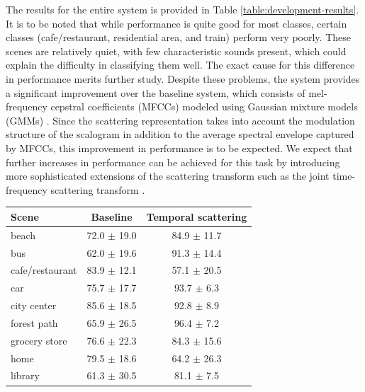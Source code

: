 \documentclass{article}
\begin{document}
\begin{sloppy}
The results for the entire system is provided in Table \ref{table:development-results}. It is to be noted that while performance is quite good for most classes, certain classes (\textsf{cafe/restaurant}, \textsf{residential area}, and \textsf{train}) perform very poorly. These scenes are relatively quiet, with few characteristic sounds present, which could explain the difficulty in classifying them well. The exact cause for this difference in performance merits further study. Despite these problems, the system provides a significant improvement over the baseline system, which consists of mel-frequency cepstral coefficients (MFCCs) modeled using Gaussian mixture models (GMMs) \cite{heittola}. Since the scattering representation takes into account the modulation structure of the scalogram in addition to the average spectral envelope captured by MFCCs, this improvement in performance is to be expected. We expect that further increases in performance can be achieved for this task by introducing more sophisticated extensions of the scattering transform such as the joint time-frequency scattering transform \cite{joint}.

\begin{table}[!htbp]
\centering
\begin{tabular}{lcc}
\toprule
Scene & Baseline & Temporal scattering \\
\midrule
beach & 72.0 $\pm$ 19.0 & 84.9 $\pm$ 11.7 \\

bus & 62.0 $\pm$ 19.6 & 91.3 $\pm$ 14.4 \\

cafe/restaurant & 83.9 $\pm$ 12.1 & 57.1 $\pm$ 20.5 \\

car & 75.7 $\pm$ 17.7 & 93.7 $\pm$  \phantom{0}6.3 \\

city center & 85.6 $\pm$ 18.5 & 92.8 $\pm$  \phantom{0}8.9 \\

forest path & 65.9 $\pm$ 26.5 & 96.4 $\pm$  \phantom{0}7.2 \\

grocery store & 76.6 $\pm$ 22.3 & 84.3 $\pm$ 15.6 \\

home & 79.5 $\pm$ 18.6 & 64.2 $\pm$ 26.3 \\

library & 61.3 $\pm$ 30.5 & 81.1 $\pm$  \phantom{0}7.5 \\


\end{tabular}
\end{table}
\end{sloppy}
\end{document}
